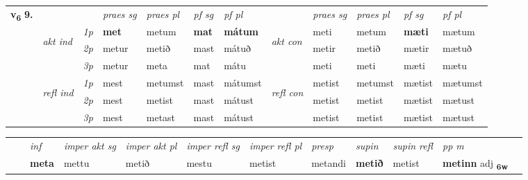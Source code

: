 \begin{tabular}{llllllllllll} \toprule
\multirow{4}{*}{{{\textbf{v{\textsubscript{6}}} \Large{\textbf{9.}}}}}  & &   &  \textit{praes sg}  & \textit{praes pl}  &\textit{ pf sg} & \textit{pf pl} &  &  \textit{praes sg}  & \textit{praes pl}  & \textit{pf sg} & \textit{pf pl } \\*
	\cmidrule{4-7} \cmidrule{9-12}
 & \multirow{3}{*}{\begin{turn}{90}\textit{akt ind}\end{turn}} & {\textit{1p}} & \textbf{met} & metum    & \textbf{mat} & \textbf{mátum} & \multirow{3}{*}{\begin{turn}{90}\textit{akt con}\end{turn}} &meti & metum & \textbf{mæti} & mætum\\*
& &  {\textit{2p}} &  metur  & metið   & mast & mátuð & & metir & metið & mætir & mætuð \\*
& &  {\textit{3p}} & metur & meta   & mat & mátu & & meti & meti& mæti & mætu  \\*
\cmidrule{4-7} \cmidrule{9-12}
 &\multirow{3}{*}{\begin{turn}{90}\textit{refl ind}\end{turn}} & {\textit{1p}} & mest & metumst    & mast & mátumst & \multirow{3}{*}{\begin{turn}{90}\textit{refl con}\end{turn}}  &metist & metumst & mætist & mætumst\\*
 &&  {\textit{2p}} &  mest  & metist   & mast & mátust & &metist & metist & mætist & mætust \\*
& &  {\textit{3p}} & mest & metast   & mast & mátust & & metist & metist& mætist & mætust  \\*
\cmidrule{4-7} \cmidrule{9-12}
\end{tabular}


\begin{tabular}{llllllllllll}
 & & \textit{inf} & \textit{imper akt sg} & \textit{imper akt pl} & \textit{imper refl sg} & \textit{imper refl pl} & \textit{presp} & \textit{supin} & \textit{supin refl} & \textit{pp m}     \\*
  & & \textbf{meta} & mettu  & metið & mestu & metist & metandi &  \textbf{metið} & metist & \textbf{metinn} adj \textbf{\textsubscript{6w}} \\*
\cmidrule{1-12}
\end{tabular}



